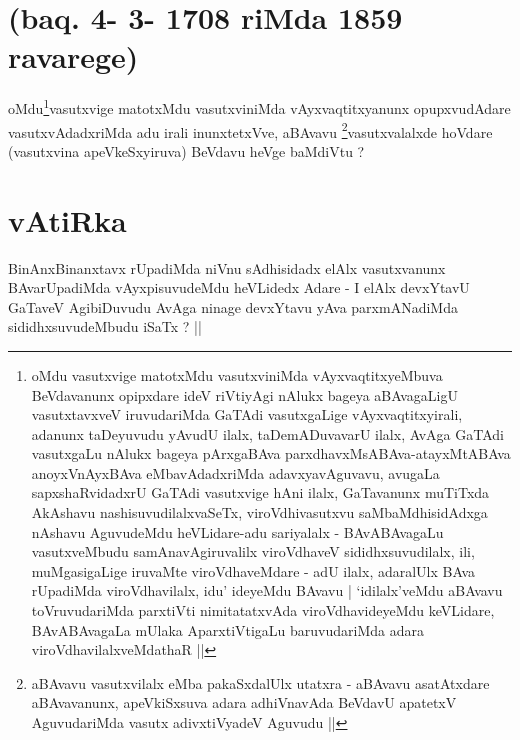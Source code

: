 
\section*{(baq. 4- 3- 1708 riMda 1859 ravarege)}


\begin{artha}
oMdu\footnote[1]{oMdu vasutxvige matotxMdu vasutxviniMda
  vAyxvaqtitxyeMbuva BeVdavanunx opipxdare ideV riVtiyAgi nAlukx
  bageya aBAvagaLigU vasutxtavxveV iruvudariMda GaTAdi vasutxgaLige
  vAyxvaqtitxyirali, adanunx taDeyuvudu yAvudU ilalx, taDemADuvavarU
  ilalx, AvAga GaTAdi vasutxgaLu nAlukx bageya pArxgaBAva
  parxdhavxMsABAva-atayxMtABAva anoyxVnAyxBAva eMbavAdadxriMda
  adavxyavAguvavu, avugaLa sapxshaRvidadxrU GaTAdi vasutxvige hAni
  ilalx, GaTavanunx muTiTxda AkAshavu nashisuvudilalxvaSeTx,
  viroVdhivasutxvu saMbaMdhisidAdxga nAshavu AguvudeMdu heVLidare-adu
  sariyalalx - BAvABAvagaLu vasutxveMbudu samAnavAgiruvalilx
  viroVdhaveV sididhxsuvudilalx, ili, muMgasigaLige iruvaMte
  viroVdhaveMdare - adU ilalx, adaralUlx BAva rUpadiMda
  viroVdhavilalx, idu' ideyeMdu BAvavu | `idilalx'veMdu aBAvavu
  toVruvudariMda parxtiVti nimitatatxvAda viroVdhavideyeMdu keVLidare,
  BAvABAvagaLa mUlaka AparxtiVtigaLu baruvudariMda adara
  viroVdhavilalxveMdathaR ||
}vasutxvige matotxMdu vasutxviniMda
vAyxvaqtitxyanunx opupxvudAdare vasutxvAdadxriMda adu irali
inunxtetxVve, aBAvavu \footnote[2]{aBAvavu vasutxvilalx eMba
  pakaSxdalUlx utatxra - aBAvavu asatAtxdare aBAvavanunx, apeVkiSxsuva
adara adhiVnavAda BeVdavU apatetxV AguvudariMda vasutx adivxtiVyadeV
Aguvudu ||}vasutxvalalxde hoVdare (vasutxvina
apeVkeSxyiruva) BeVdavu heVge baMdiVtu ?
\end{artha}

\section*{vAtiRka}


\begin{artha}
BinAnxBinanxtavx rUpadiMda niVnu sAdhisidadx elAlx vasutxvanunx
BAvarUpadiMda vAyxpisuvudeMdu heVLidedx Adare - I elAlx devxYtavU
GaTaveV AgibiDuvudu AvAga ninage  devxYtavu yAva parxmANadiMda
sididhxsuvudeMbudu iSaTx ? ||
\end{artha}

